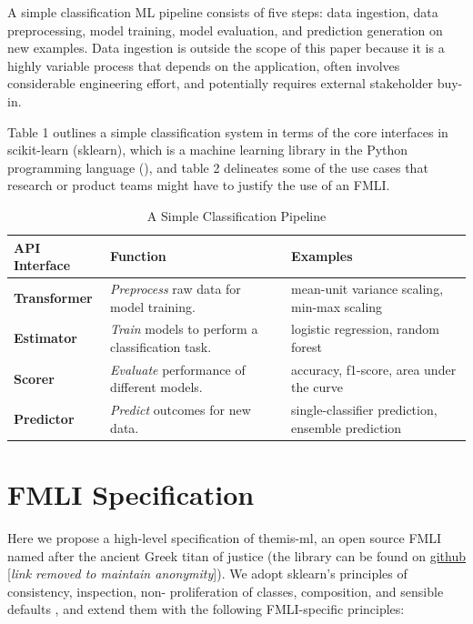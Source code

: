 \documentclass[man,natbib]{apa6}
\begin{document}
A simple classification ML pipeline consists of five steps: data ingestion, data
preprocessing, model training, model evaluation, and prediction generation on
new examples. Data ingestion is outside the scope of this paper because it is a
highly variable process that depends on the application, often involves
considerable engineering effort, and potentially requires external stakeholder
buy-in.

Table 1 outlines a simple classification system in terms of the core interfaces
in scikit-learn (sklearn), which is a machine learning library in the Python
programming language (\citealp{scikit-learn}), and table 2 delineates some of the
use cases that research or product teams might have to justify the use of an
FMLI.


\begin{table}
  \caption{A Simple Classification Pipeline}
  \renewcommand{\arraystretch}{1.75}
  \small\noindent\begin{tabularx}{\linewidth}{l X X}
    \textbf{API Interface} & \textbf{Function} & \textbf{Examples} \\
    \hline
    \textbf{Transformer} &
      \emph{Preprocess} raw data for model training. &
      mean-unit variance scaling, min-max scaling \\
    \textbf{Estimator} &
      \emph{Train} models to perform a classification task. &
      logistic regression, random forest \\
    \textbf{Scorer} &
      \emph{Evaluate} performance of different models. &
      accuracy, f1-score, area under the curve \\
    \textbf{Predictor} &
      \emph{Predict} outcomes for new data. &
      single-classifier prediction, ensemble prediction
  \end{tabularx}
\end{table}


\section{FMLI Specification}

Here we propose a high-level specification of themis-ml, an open source FMLI
named after the ancient Greek titan of justice (the library can be found on
\underline{github} [\emph{link removed to maintain anonymity}]).
We adopt sklearn's principles of consistency, inspection, non- proliferation of
classes, composition, and sensible defaults \cite{buitinck2013api}, and extend
them with the following FMLI-specific principles:
\end{document}
